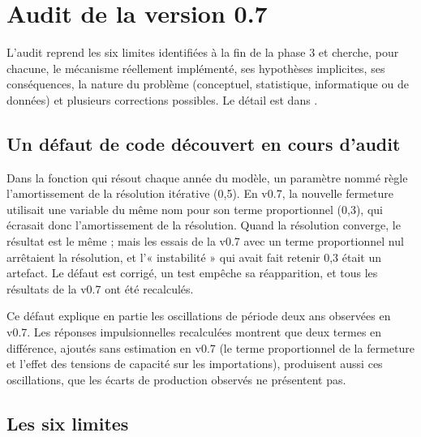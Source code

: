 \chapter{Audit de la version 0.7}\label{ch:audit}

L'audit reprend les six limites identifiées à la fin de la phase 3 et cherche, pour chacune, le mécanisme réellement
implémenté, ses hypothèses implicites, ses conséquences, la nature du problème (conceptuel, statistique,
informatique ou de données) et plusieurs corrections possibles. Le détail est dans .

\section{Un défaut de code découvert en cours d'audit}

\begin{limites}[Défaut de la v0.7]
Dans la fonction qui résout chaque année du modèle, un paramètre nommé  règle l'amortissement de la
résolution itérative (0,5). En v0.7, la nouvelle fermeture utilisait une variable du même nom pour son terme
proportionnel (0,3), qui écrasait donc l'amortissement de la résolution. Quand la résolution converge, le résultat est
le même ; mais les essais de la v0.7 avec un terme proportionnel nul arrêtaient la résolution, et l'« instabilité »
qui avait fait retenir 0,3 était un artefact. Le défaut est corrigé, un test empêche sa réapparition, et tous les
résultats de la v0.7 ont été recalculés.
\end{limites}

Ce défaut explique en partie les oscillations de période deux ans observées en v0.7. Les réponses impulsionnelles
recalculées montrent que deux termes en différence, ajoutés sans estimation en v0.7 (le terme proportionnel de la
fermeture et l'effet des tensions de capacité sur les importations), produisent aussi ces oscillations, que les
écarts de production observés ne présentent pas.

\section{Les six limites}

